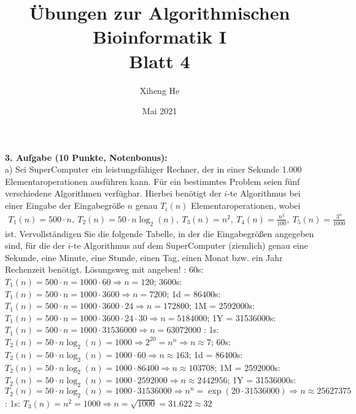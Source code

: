 \documentclass{article}
\title{Übungen zur Algorithmischen Bioinformatik I\\
Blatt 4}
\author{Xiheng He }
\date{Mai 2021}
\begin{document}
\maketitle
\begin{flushleft}
\textbf{3. Aufgabe (10 Punkte, Notenbonus):}\\
a) Sei SuperComputer ein leistungsfähiger Rechner, der in einer Sekunde 1.000 Elementaroperationen ausführen kann. 
Für ein bestimmtes Problem seien fünf verschiedene Algorithmen verfügbar. Hierbei benötigt der $i$-te Algorithmus 
bei einer Eingabe der Eingabegröße $n$ genau $T_i(n)$ Elementaroperationen, wobei
\begin{align*}
T_1(n) = 500 \cdot n,\ T_2(n) = 50 \cdot n\log_2(n),\ T_3(n) = n^2,\ T_4(n) = \frac{n^3}{100},\ T_5(n) = \frac{3^n}{1000}
\end{align*}
ist. Vervollständigen Sie die folgende Tabelle, in der die Eingabegrößen angegeben sind, für die
der $i$-te Algorithmus auf dem SuperComputer (ziemlich) genau eine Sekunde, eine Minute, eine
Stunde, einen Tag, einen Monat bzw. ein Jahr Rechenzeit benötigt. Lösungsweg mit angeben!
\newline
{}: 
\newline
60s: $T_1(n) = 500 \cdot n = 1000 \cdot 60 \Longrightarrow n = 120$; 
3600s: $T_1(n) = 500 \cdot n = 1000 \cdot 3600 \Longrightarrow n = 7200$;
1d = 86400s: $T_1(n) = 500 \cdot n = 1000 \cdot 3600 \cdot 24 \Longrightarrow n = 172800$;
1M = 2592000s: $T_1(n) = 500 \cdot n = 1000 \cdot 3600 \cdot 24 \cdot 30 \Longrightarrow n = 5184000$;
1Y = 31536000s: $T_1(n) = 500 \cdot n = 1000 \cdot 31536000 \Longrightarrow n = 63072000$
\newline
{}: 
\newline
1s: $T_2(n) = 50 \cdot n\log_2(n) = 1000 \Longrightarrow 2^{20} = n^n \Longrightarrow n \approx 7$;
60s: $T_2(n) = 50 \cdot n\log_2(n) = 1000 \cdot 60 \Longrightarrow n \approx 163$;
1d = 86400s: $T_2(n) = 50 \cdot n\log_2(n) = 1000 \cdot 86400 \Longrightarrow n \approx 103708$;
\newline
1M = 2592000s: $T_2(n) = 50 \cdot n\log_2(n) = 1000 \cdot 2592000 \Longrightarrow n \approx 2442956$;
\newline
1Y = 31536000s: $T_2(n) = 50 \cdot n\log_2(n) = 1000 \cdot 31536000 \Longrightarrow n^n = \exp (20 \cdot 31536000 )
\Longrightarrow n \approx 25627375$
\newline
{}:
\newline
1s: $T_3(n) = n^2 = 1000 \Longrightarrow n = \sqrt{1000} = 31.622 \approx 32$

\end{flushleft}
\end{document}
